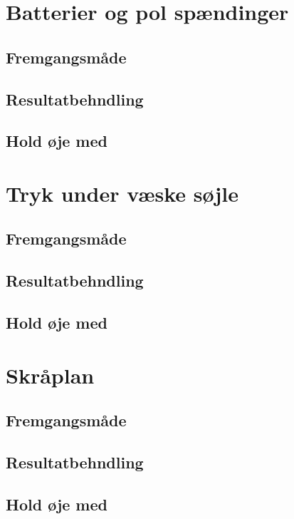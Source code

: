 \section{Batterier og pol spændinger}
\subsection{Fremgangsmåde}

\subsection{Resultatbehndling}

\subsection{Hold øje med}

\section{Tryk under væske søjle}
\subsection{Fremgangsmåde}

\subsection{Resultatbehndling}

\subsection{Hold øje med}

\section{Skråplan}
\subsection{Fremgangsmåde}

\subsection{Resultatbehndling}

\subsection{Hold øje med}

